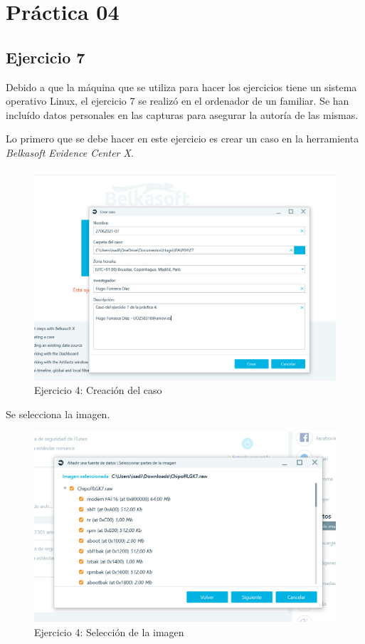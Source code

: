 \documentclass[11pt]{article}
\begin{document}
\section{Práctica 04}

\subsection{Ejercicio 7}
Debido a que la máquina que se utiliza para hacer los ejercicios tiene un sistema operativo Linux, el ejercicio 7 se realizó en el ordenador de un familiar. Se han incluído datos personales en las capturas para asegurar la autoría de las mismas.

Lo primero que se debe hacer en este ejercicio es crear un caso en la herramienta \textit{Belkasoft Evidence Center X}.

\begin{figure}[H]
    \caption{Ejercicio 4: Creación del caso}
    \centering
    \includegraphics[scale=0.6]{p04/e7-1.PNG}
\end{figure}

Se selecciona la imagen.

\begin{figure}[H]
    \caption{Ejercicio 4: Selección de la imagen}
    \centering
    \includegraphics[scale=0.7]{p04/e7-2.PNG}
\end{figure}
\end{document}
